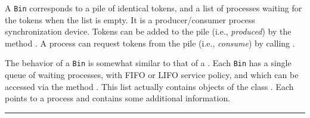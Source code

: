 
A \texttt{Bin} corresponds to a pile of identical tokens, and a list of
processes waiting for the tokens when the list is empty.
It is a producer/consumer process synchronization device.
Tokens can be added to the pile (i.e., {\em produced\/}) by the
method .
A process can request tokens from the pile (i.e., {\em consume\/})
by calling .

The behavior of a \texttt{Bin} is somewhat similar to that of a
.  Each \texttt{Bin} has a single queue of waiting
processes, with FIFO or LIFO service policy, and
which can be accessed via the method .
This list actually contains objects of the class .
Each  points to a process
and contains some additional information.

\bigskip\hrule

